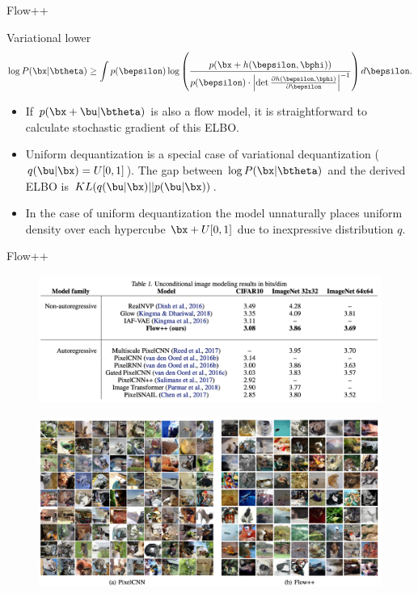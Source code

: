 \begin{frame}{Flow++}
	\begin{block}{Variational lower}
	\vspace{-0.3cm}
	\[
		\log P(\bx | \btheta) \geq \int p(\bepsilon)\log \left( \frac{p(\bx + h(\bepsilon, \bphi))}{p(\bepsilon) \cdot \left| \det \frac{\partial h(\bepsilon, \bphi)}{\partial \bepsilon}\right|^{-1}} \right) d\bepsilon.
	\]
	\end{block}
	\begin{itemize}
	\item If $p(\bx + \bu | \btheta)$ is also a flow model, it is straightforward to calculate stochastic gradient of this ELBO.
	
	\item Uniform dequantization is a special case of variational dequantization ($q(\bu | \bx) = U[0, 1]$).
	The gap between $\log P(\bx | \btheta)$ and the derived ELBO is 
	$ KL(q(\bu | \bx) || p(\bu | \bx))$.
	\item In the case of uniform dequantization the model unnaturally places uniform density over each hypercube $\bx + U[0, 1]$ due to inexpressive distribution $q$.
	\end{itemize}
\end{frame}
\begin{frame}{Flow++}
	\begin{figure}
		\centering
		\includegraphics[width=0.7\linewidth]{figs/flow++1.png}
	\end{figure}
	\vspace{-0.1cm}
	\begin{figure}
		\centering
		\includegraphics[width=0.8\linewidth]{figs/flow++2.png}
	\end{figure}
\end{frame}
